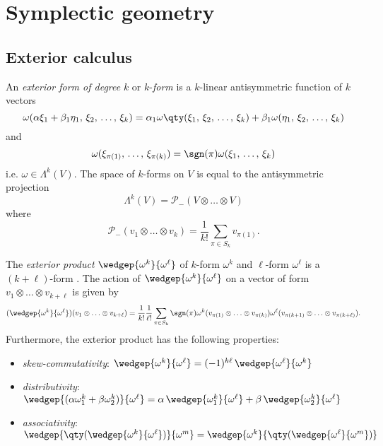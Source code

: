 \chapter{Symplectic geometry}

\section{Exterior calculus}

An \emph{exterior form of degree} $k$ or $k$-\emph{form} is a $k$-linear antisymmetric function of $k$ vectors
$$ \omega(\alpha \xi_1 + \beta_1\eta_1,\,\xi_2,\, \ldots,\, \xi_k) = \alpha_1\omega\qty(\xi_1,\, \xi_2,\, \ldots,\, \xi_k) 
   + \beta_1\omega(\eta_1,\, \xi_2,\, \ldots,\, \xi_k)$$ 
and 
$$ \omega(\xi_{\pi(1)},\, \ldots,\, \xi_{\pi(k)}) = \sgn(\pi)\omega(\xi_1,\, \ldots,\, \xi_k) $$
i.e. $\omega \in \Lambda^k(V)$. The space of $k$-forms on $V$ is equal to the antisymmetric projection
$$ \Lambda^k(V) = \mathscr{P}_-(V\otimes\ldots\otimes V) $$
where
$$ \mathscr{P}_-(v_1\otimes\ldots\otimes v_k) = \frac{1}{k!}\sum_{\pi\in S_k} v_{\pi(1)}.$$

The \emph{exterior product} $\wedgep{\omega^k}{\omega^\ell}$ of $k$-form $\omega^k$ and $\ell$-form $\omega^\ell$ is a 
$(k + \ell)$-form . The action of $\wedgep{\omega^k}{\omega^\ell}$ on a vector of form $ v_1 \otimes \ldots \otimes v_{k+\ell}$
is given by 
$$ (\wedgep{\omega^k}{\omega^\ell})(v_1 \otimes \ldots \otimes v_{k+\ell}) 
   = \frac{1}{k!}\frac{1}{\ell!} \sum_{\pi \in S_k} \sgn(\pi)\omega^{k}(v_{\pi(1)} \otimes \ldots \otimes v_{\pi(k)})
     \omega^\ell(v_{\pi(k+1)} \otimes \ldots \otimes v_{\pi(k+\ell)}). $$
Furthermore, the exterior product has the following properties:
\begin{itemize}
    \item \emph{skew-commutativity}:  $ \wedgep{\omega^k}{\omega^\ell} = (-1)^{k\ell}\,\wedgep{\omega^\ell}{\omega^k}$
    \item \emph{distributivity}: $ \wedgep{(\alpha \omega_1^k + \beta\omega^k_2)}{\omega^\ell} = 
                                   \alpha\,\wedgep{\omega_1^k}{\omega^\ell} + \beta\, \wedgep{\omega^k_2}{\omega^\ell} $ 
    \item \emph{associativity}: $ \wedgep{\qty(\wedgep{\omega^k}{\omega^\ell})}{\omega^m} = \wedgep{\omega^k}{\qty(\wedgep{\omega^\ell}{\omega^m})}$
\end{itemize}

